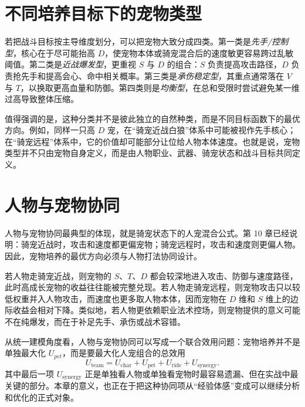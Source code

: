 \section{不同培养目标下的宠物类型}

若把战斗目标按主导维度划分，可以把宠物大致分成四类。第一类是\emph{先手/控制型}，核心在于尽可能抬高 $D$，使宠物本体或骑宠混合后的速度敏更容易跨过乱敏阈值。第二类是\emph{近战爆发型}，更重视 $S$ 与 $D$ 的组合：$S$ 负责提高攻击路径，$D$ 负责抢先手和提高会心、命中相关概率。第三类是\emph{承伤稳定型}，其重点通常落在 $V$ 与 $T$，以换取更高血量和防御。第四类则是\emph{均衡型}，在总和受限时尝试避免某一维过高导致整体压缩。

值得强调的是，这种分类并不是彼此独立的自然种类，而是不同目标函数下的最优方向。例如，同样一只高 $D$ 宠，在“骑宠近战白狼”体系中可能被视作先手核心；在“骑宠远程”体系中，它的价值却可能部分让位给人物本体速度。也就是说，宠物类型并不只由宠物自身定义，而是由人物职业、武器、骑宠状态和战斗目标共同定义。

\section{人物与宠物协同}

人物与宠物协同最典型的体现，就是骑宠状态下的人宠混合公式。第 10 章已经说明：骑宠近战时，攻击和速度都更偏宠物；骑宠远程时，攻击和速度则更偏人物。因此，宠物培养的最优方向必须与人物打法协同设计。

若人物走骑宠近战，则宠物的 $S$、$T$、$D$ 都会较深地进入攻击、防御与速度路径，此时高成长宠物的收益往往能被完整兑现。若人物走骑宠远程，则宠物攻击只以较低权重并入人物攻击，而速度也更多取人物本体，因而宠物在 $D$ 维和 $S$ 维上的边际收益会相对下降。类似地，若人物更依赖职业法术控场，则宠物提供的意义可能不在纯爆发，而在于补足先手、承伤或战术容错。

从统一建模角度看，人物与宠物协同可以写成一个联合效用问题：宠物培养并不是单独最大化 $U_{pet}$，而是要最大化人宠组合的总效用
\begin{equation}
    U_{\mathrm{team}} = U_{\mathrm{char}} + U_{\mathrm{pet}} + U_{\mathrm{ride}} + U_{\mathrm{synergy}}.
\end{equation}
其中最后一项 $U_{\mathrm{synergy}}$ 正是单独看人物或单独看宠物时最容易遗漏、但在实战中最关键的部分。本章的意义，也正在于把这种协同项从“经验体感”变成可以继续分析和优化的正式对象。

